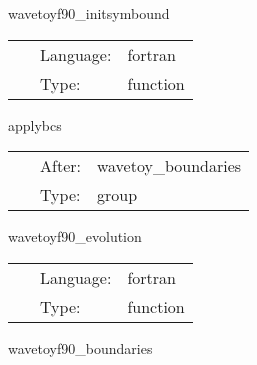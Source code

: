 \hspace{5mm} wavetoyf90\_initsymbound 

\hspace{5mm}{\it schedule symmetries } 


\hspace{5mm}

 \begin{tabular*}{160mm}{cll} 
~ & Language:  & fortran \\ 
~ & Type:  & function \\ 
\end{tabular*} 


\vspace{5mm}


\hspace{5mm} applybcs 

\hspace{5mm}{\it apply boundary conditions } 


\hspace{5mm}

 \begin{tabular*}{160mm}{cll} 
~ & After:  & wavetoy\_boundaries \\ 
~ & Type:  & group \\ 
\end{tabular*} 


\vspace{5mm}


\hspace{5mm} wavetoyf90\_evolution 

\hspace{5mm}{\it evolution of 3d wave equation } 


\hspace{5mm}

 \begin{tabular*}{160mm}{cll} 
~ & Language:  & fortran \\ 
~ & Type:  & function \\ 
\end{tabular*} 


\vspace{5mm}


\hspace{5mm} wavetoyf90\_boundaries 

\hspace{5mm}{\it boundaries of 3d wave equation } 


